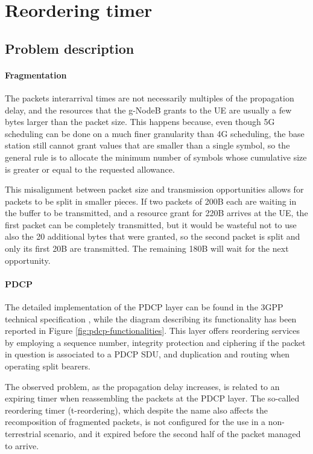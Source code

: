 \section{Reordering timer}

\subsection{Problem description}
\paragraph{Fragmentation}
The packets interarrival times are not necessarily multiples of the propagation delay, and the resources that the g-NodeB grants to the \ac{UE} are usually a few bytes larger than the packet size. This happens because, even though 5G scheduling can be done on a much finer granularity than 4G scheduling, the base station still cannot grant values that are smaller than a single symbol, so the general rule is to allocate the minimum number of symbols whose cumulative size is greater or equal to the requested allowance.

This misalignment between packet size and transmission opportunities allows for packets to be split in smaller pieces. If two packets of 200B each are waiting in the buffer to be transmitted, and a resource grant for 220B arrives at the \ac{UE}, the first packet can be completely transmitted, but it would be wasteful not to use also the 20 additional bytes that were granted, so the second packet is split and only its first 20B are transmitted. The remaining 180B will wait for the next opportunity.

\paragraph{PDCP}
The detailed implementation of the \ac{PDCP} layer can be found in the \ac{3GPP} technical specification \cite{pdcp-spec-3gpp}, while the diagram describing its functionality has been reported in Figure \ref{fig:pdcp-functionalities}. This layer offers reordering services by employing a sequence number, integrity protection and ciphering if the packet in question is associated to a \ac{PDCP} \ac{SDU}, and duplication and routing when operating split bearers.

The observed problem, as the propagation delay increases, is related to an expiring timer when reassembling the packets at the \ac{PDCP} layer. The so-called reordering timer (t-reordering), which despite the name also affects the recomposition of fragmented packets, is not configured for the use in a non-terrestrial scenario, and it expired before the second half of the packet managed to arrive. 

